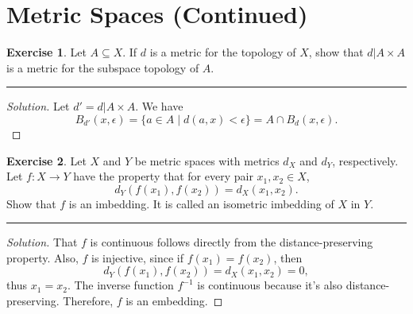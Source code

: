 \documentclass{article}
\theoremstyle{definition}
\newtheorem{exercise}{Exercise}[section]
\begin{document}
\addtocounter{section}{20}
\section{Metric Spaces (Continued)}

\begin{exercise}
  Let $A\subseteq X$. If $d$ is a metric for the topology of $X$, show that $d|A\times A$ is a metric for the subspace topology of $A$.
\end{exercise}
\hrule
\begin{proof}[Solution]
  Let $d' = d|A\times A$. We have
  $$B_{d'}(x,\epsilon) = \{a\in A\mid d(a,x) < \epsilon\} = A\cap B_d(x,\epsilon).$$
\end{proof}

\pagebreak

\begin{exercise}
  Let $X$ and $Y$ be metric spaces with metrics $d_X$ and $d_Y$, respectively. Let $f:X\to Y$ have the property that for every pair $x_1,x_2\in X$,
  $$d_Y(f(x_1),f(x_2)) = d_X(x_1,x_2).$$
  Show that $f$ is an imbedding. It is called an isometric imbedding of $X$ in $Y$.
\end{exercise}
\hrule
\begin{proof}[Solution]
  That $f$ is continuous follows directly from the distance-preserving property. Also, $f$ is injective, since if $f(x_1) = f(x_2)$, then $$d_Y(f(x_1),f(x_2)) = d_X(x_1,x_2) = 0,$$
  thus $x_1 = x_2$. The inverse function $f^{-1}$ is continuous because it's also distance-preserving. Therefore, $f$ is an embedding.
\end{proof}

\pagebreak
\end{document}
